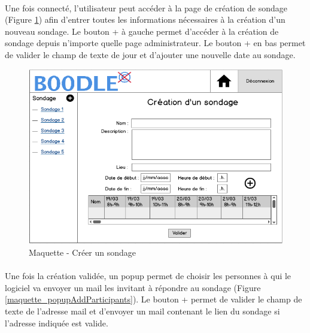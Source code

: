 \documentclass[titlepage]{report}
\begin{document}
\paragraph{} Une fois connecté, l'utilisateur peut accéder à la page de création de sondage (Figure \ref{maquette_creationEvenement}) afin d'entrer toutes les informations nécessaires à la création d'un nouveau sondage. 
Le bouton + à gauche permet d'accéder à la création de sondage depuis n'importe quelle page administrateur. 
Le bouton + en bas permet de valider le champ de texte de jour et d'ajouter une nouvelle date au sondage.

\begin{figure}[h]
	\caption{Maquette - Créer un sondage}
	\label{maquette_creationEvenement}
	\centering
	\includegraphics[scale=0.7]{figures/maquettes/creationEvenement.png}
\end{figure}

\paragraph{}Une fois la création validée, un popup permet de choisir les personnes à qui le logiciel va envoyer un mail les invitant à répondre au sondage (Figure \ref{maquette_popupAddParticipants}). 
Le bouton + permet de valider le champ de texte de l'adresse mail et d'envoyer un mail contenant le lien du sondage si l'adresse indiquée est valide.
\end{document}
